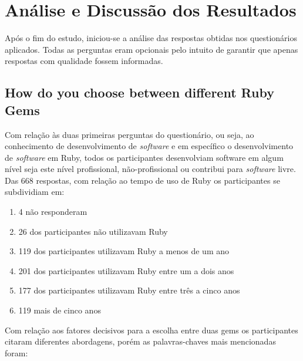 \chapter{Análise e Discussão dos Resultados}

Após o fim do estudo, iniciou-se a análise das respostas obtidas nos questionários aplicados. Todas as perguntas eram opcionais pelo intuito de garantir que apenas respostas com qualidade fossem informadas.

\section{How do you choose between different Ruby Gems}

Com relação às duas primeiras perguntas do questionário, ou seja, ao conhecimento de desenvolvimento de \textit{software} e em específico o desenvolvimento de \textit{software} em Ruby, todos os participantes desenvolviam software em algum nível seja este nível profissional, não-profissional ou contribui para \textit{software} livre. Das 668 respostas, com relação ao tempo de uso de Ruby os participantes se subdividiam em:

\begin{enumerate}
	\item 4 não responderam
	\item 26 dos participantes não utilizavam Ruby
    \item 119 dos participantes utilizavam Ruby a menos de um ano
    \item 201 dos participantes utilizavam Ruby entre um a dois anos
    \item 177 dos participantes utilizavam Ruby entre três a cinco anos
    \item 119 mais de cinco anos
\end{enumerate}

Com relação aos fatores decisivos para a escolha entre duas gems os participantes citaram diferentes abordagens, porém as palavras-chaves mais mencionadas foram:

